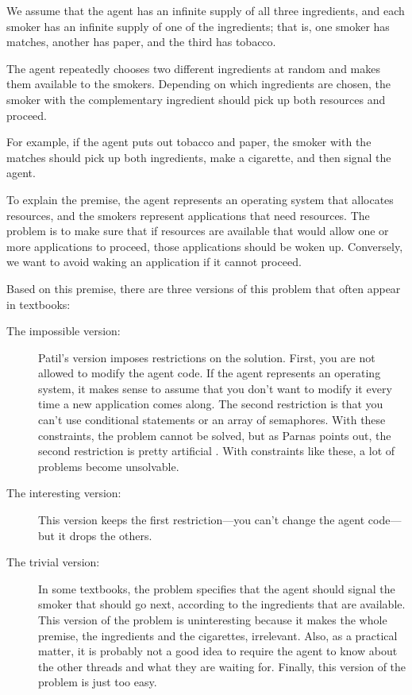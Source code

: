 We assume that the agent has an infinite supply of all three
ingredients, and each smoker has an infinite supply of one of
the ingredients; that is, one smoker has matches, another has
paper, and the third has tobacco.

The agent repeatedly chooses two different ingredients at random
and makes them available to the smokers.  Depending on which
ingredients are chosen, the smoker with the complementary ingredient
should pick up both resources and proceed.

For example, if the agent puts out tobacco and paper, the
smoker with the matches should pick up both ingredients, make
a cigarette, and then signal the agent.

To explain the premise, the agent represents an operating system that
allocates resources, and the smokers represent applications that need
resources.  The problem is to make sure that if resources are
available that would allow one or more applications to proceed,
those applications should be woken up.  Conversely, we want to avoid
waking an application if it cannot proceed.



Based on this premise, there are three versions of this problem
that often appear in textbooks:

\begin{description}

\item[The impossible version:] Patil's version imposes restrictions on
the solution.  First, you are not allowed to modify the agent code.
If the agent represents an operating system, it makes sense to assume
that you don't want to modify it every time a new application comes
along.  The second restriction is that you can't use conditional
statements or an array of semaphores.  With these constraints, the
problem cannot be solved, but as Parnas points out, the second
restriction is pretty artificial \cite{Parnas}.  With constraints like
these, a lot of problems become unsolvable.

\item[The interesting version:] This version keeps the first
restriction---you can't change the agent code---but it drops the others.

\item[The trivial version:] In some textbooks, the problem specifies
that the agent should signal the smoker that should go next, according
to the ingredients that are available.  This version of the problem
is uninteresting because it makes the whole premise, the ingredients
and the cigarettes, irrelevant.  Also, as a practical matter, it is
probably not a good idea to require the agent to know about the other
threads and what they are waiting for.  Finally, this version of
the problem is just too easy.

\end{description}

